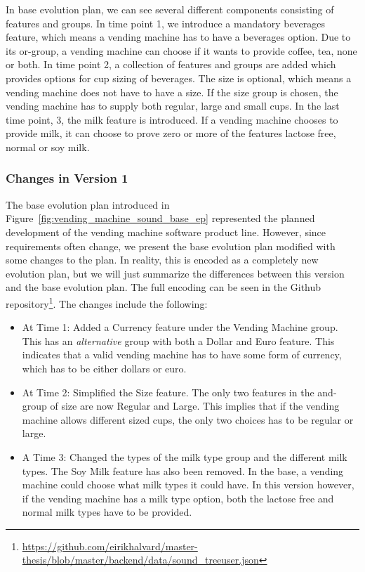 \documentclass[a4paper,english]{ifimaster}
\begin{document}
In base evolution plan, we can see several different components consisting of features and groups. In time point 1, we introduce a mandatory beverages feature, which means a vending machine has to have a beverages option. Due to its or-group, a vending machine can choose if it wants to provide coffee, tea, none or both. In time point 2, a collection of features and groups are added which provides options for cup sizing of beverages. The size is optional, which means a vending machine does not have to have a size. If the size group is chosen, the vending machine has to supply both regular, large and small cups. In the last time point, 3, the milk feature is introduced. If a vending machine chooses to provide milk, it can choose to prove zero or more of the features lactose free, normal or soy milk.

\subsubsection{Changes in Version 1}%
\label{ssub:changes_in_version_1}

The base evolution plan introduced in Figure~\vref{fig:vending_machine_sound_base_ep} represented the planned development of the vending machine software product line. However, since requirements often change, we present the base evolution plan modified with some changes to the plan. In reality, this is encoded as a completely new evolution plan, but we will just summarize the differences between this version and the base evolution plan. The full encoding can be seen in the Github repository\footnote{\url{https://github.com/eirikhalvard/master-thesis/blob/master/backend/data/sound\_treeuser.json}}. The changes include the following:

\begin{itemize}
  \item At Time 1: Added a Currency feature under the Vending Machine group. This has an \textit{alternative} group with both a Dollar and Euro feature. This indicates that a valid vending machine has to have some form of currency, which has to be either dollars or euro. 
  \item At Time 2: Simplified the Size feature. The only two features in the and-group of size are now Regular and Large. This implies that if the vending machine allows different sized cups, the only two choices has to be regular or large.
  \item A Time 3: Changed the types of the milk type group and the different milk types. The Soy Milk feature has also been removed. In the base, a vending machine could choose what milk types it could have. In this version however, if the vending machine has a milk type option, both the lactose free and normal milk types have to be provided.
\end{itemize}
\end{document}
